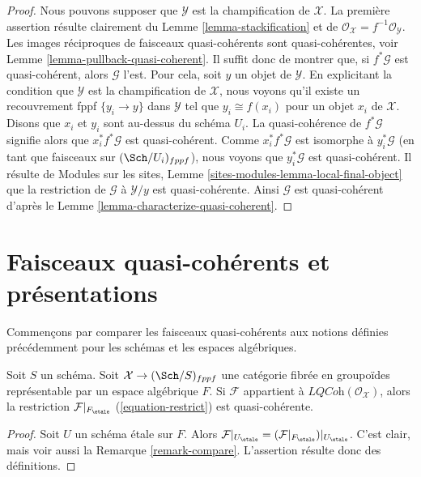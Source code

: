 \begin{proof}
Nous pouvons supposer que $\mathcal{Y}$ est la champification de $\mathcal{X}$.
La première assertion résulte clairement du
Lemme \ref{lemma-stackification}
et de
$\mathcal{O}_\mathcal{X} = f^{-1}\mathcal{O}_\mathcal{Y}$.
Les images réciproques de faisceaux quasi-cohérents sont quasi-cohérentes, voir
Lemme \ref{lemma-pullback-quasi-coherent}.
Il suffit donc de montrer que, si $f^*\mathcal{G}$ est
quasi-cohérent, alors $\mathcal{G}$ l'est.
Pour cela, soit $y$ un objet de $\mathcal{Y}$.
En explicitant la condition que $\mathcal{Y}$ est la champification
de $\mathcal{X}$, nous voyons qu'il existe un recouvrement fppf $\{y_i \to y\}$
dans $\mathcal{Y}$ tel que $y_i \cong f(x_i)$ pour un
objet $x_i$ de $\mathcal{X}$. Disons que $x_i$ et $y_i$ sont au-dessus du schéma $U_i$.
La quasi-cohérence de $f^*\mathcal{G}$ signifie alors que $x_i^*f^*\mathcal{G}$
est quasi-cohérent. Comme $x_i^*f^*\mathcal{G}$ est isomorphe à
$y_i^*\mathcal{G}$ (en tant que faisceaux sur $(\Sch/U_i)_{fppf}$), nous
voyons que $y_i^*\mathcal{G}$ est quasi-cohérent.
Il résulte de
Modules sur les sites, Lemme \ref{sites-modules-lemma-local-final-object}
que la restriction de $\mathcal{G}$ à $\mathcal{Y}/y$ est
quasi-cohérente. Ainsi $\mathcal{G}$ est quasi-cohérent d'après le
Lemme \ref{lemma-characterize-quasi-coherent}.
\end{proof}





\section{Faisceaux quasi-cohérents et présentations}
\label{section-quasi-coherent-presentation}

\noindent
Commençons par comparer les faisceaux quasi-cohérents aux notions définies
précédemment pour les schémas et les espaces algébriques.

\begin{lemma}
\label{lemma-compare-locally-quasi-coherent}
Soit $S$ un schéma. Soit $\mathcal{X} \to (\Sch/S)_{fppf}$ une catégorie
fibrée en groupoïdes représentable par un espace algébrique $F$.
Si $\mathcal{F}$ appartient à $\textit{LQCoh}(\mathcal{O}_\mathcal{X})$,
alors la restriction $\mathcal{F}|_{F_\etale}$ (\ref{equation-restrict})
est quasi-cohérente.
\end{lemma}

\begin{proof}
Soit $U$ un schéma \'etale sur $F$. Alors
$\mathcal{F}|_{U_\etale} = (\mathcal{F}|_{F_\etale})|_{U_\etale}$.
C'est clair, mais voir aussi la Remarque \ref{remark-compare}.
L'assertion résulte donc des définitions.
\end{proof}

